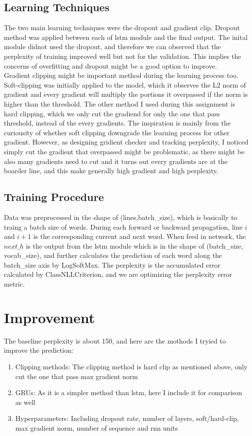 \documentclass{article}
\begin{document}
\subsection{Learning Techniques}
The two main learning techniques were the dropout and gradient clip. Dropout method was applied between each of lstm module and the final output. The inital module didnot used the dropout, and therefore we can observed that the perplexity of training improved well but not for the validation. This implies the concerns of overfitting and dropout might be a good option to improve.\\
Gradient clipping might be important method during the learning process too. Soft-clipping was initially applied to the model, which it observes the L2 norm of gradient and every gradient will multiply the portions it overpassed if the norm is higher than the threshold. The other method I used during this assignment is hard clipping, which we only cut the gradiend for only the one that pass threshold, instead of the every gradients. The inspiration is mainly from the curiousity of whether soft clipping downgrade the learning process for other gradient. However, as designing gridient checker and tracking perplexity, I noticed simply cut the gradient that overpassed might be problematic, as there might be also many gradients need to cut and it turns out every gradients are at the boarder line, and this make generally high gradient and high perplexity.

\subsection{Training Procedure}
Data was preprocessed in the shape of (lines,batch\_size), which is basically to traing a batch size of words. During each forward or backward propagation, line $i$ and $i+1$ is the corresponding current and next word. When feed in network, the $next\_h$ is the output from the lstm module which is in the shape of (batch\_size, vocab\_size), and further calculates the prediction of each word along the batch\_size axis by LogSoftMax. The perplexity is the accumulated error calculated by ClassNLLCriterion, and we are optimizing the perplexity error metric.

\section{Improvement}
The baseline perplexity is about 150, and here are the mothods I tryied to improve the prediction:
\begin{enumerate}
   \item Clipping methods: The clipping method is hard clip as mentioned above, only cut the one that pass max gradient norm
   \item GRUs: As it is a simpler method than lstm, here I include it for comparison as well
   \item Hyperparameters: Including dropout rate, number of layers, soft/hard-clip, max gradient norm, number of sequence and rnn units
\end{enumerate}
\end{document}
